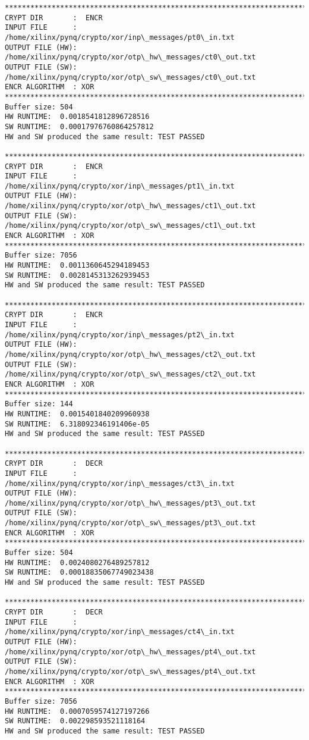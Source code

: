 \documentclass[11pt]{article}
\begin{document}
    \begin{Verbatim}[commandchars=\\\{\}]
********************************************************************************
CRYPT DIR       :  ENCR
INPUT FILE      :  /home/xilinx/pynq/crypto/xor/inp\_messages/pt0\_in.txt
OUTPUT FILE (HW):  /home/xilinx/pynq/crypto/xor/otp\_hw\_messages/ct0\_out.txt
OUTPUT FILE (SW):  /home/xilinx/pynq/crypto/xor/otp\_sw\_messages/ct0\_out.txt
ENCR ALGORITHM  : XOR
********************************************************************************
Buffer size: 504
HW RUNTIME:  0.0018541812896728516
SW RUNTIME:  0.00017976760864257812
HW and SW produced the same result: TEST PASSED

********************************************************************************
CRYPT DIR       :  ENCR
INPUT FILE      :  /home/xilinx/pynq/crypto/xor/inp\_messages/pt1\_in.txt
OUTPUT FILE (HW):  /home/xilinx/pynq/crypto/xor/otp\_hw\_messages/ct1\_out.txt
OUTPUT FILE (SW):  /home/xilinx/pynq/crypto/xor/otp\_sw\_messages/ct1\_out.txt
ENCR ALGORITHM  : XOR
********************************************************************************
Buffer size: 7056
HW RUNTIME:  0.0011360645294189453
SW RUNTIME:  0.0028145313262939453
HW and SW produced the same result: TEST PASSED

********************************************************************************
CRYPT DIR       :  ENCR
INPUT FILE      :  /home/xilinx/pynq/crypto/xor/inp\_messages/pt2\_in.txt
OUTPUT FILE (HW):  /home/xilinx/pynq/crypto/xor/otp\_hw\_messages/ct2\_out.txt
OUTPUT FILE (SW):  /home/xilinx/pynq/crypto/xor/otp\_sw\_messages/ct2\_out.txt
ENCR ALGORITHM  : XOR
********************************************************************************
Buffer size: 144
HW RUNTIME:  0.0015401840209960938
SW RUNTIME:  6.318092346191406e-05
HW and SW produced the same result: TEST PASSED

********************************************************************************
CRYPT DIR       :  DECR
INPUT FILE      :  /home/xilinx/pynq/crypto/xor/inp\_messages/ct3\_in.txt
OUTPUT FILE (HW):  /home/xilinx/pynq/crypto/xor/otp\_hw\_messages/pt3\_out.txt
OUTPUT FILE (SW):  /home/xilinx/pynq/crypto/xor/otp\_sw\_messages/pt3\_out.txt
ENCR ALGORITHM  : XOR
********************************************************************************
Buffer size: 504
HW RUNTIME:  0.0024080276489257812
SW RUNTIME:  0.00018835067749023438
HW and SW produced the same result: TEST PASSED

********************************************************************************
CRYPT DIR       :  DECR
INPUT FILE      :  /home/xilinx/pynq/crypto/xor/inp\_messages/ct4\_in.txt
OUTPUT FILE (HW):  /home/xilinx/pynq/crypto/xor/otp\_hw\_messages/pt4\_out.txt
OUTPUT FILE (SW):  /home/xilinx/pynq/crypto/xor/otp\_sw\_messages/pt4\_out.txt
ENCR ALGORITHM  : XOR
********************************************************************************
Buffer size: 7056
HW RUNTIME:  0.0007059574127197266
SW RUNTIME:  0.002298593521118164
HW and SW produced the same result: TEST PASSED


\end{Verbatim}
\end{document}
